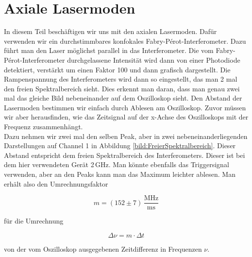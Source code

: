 \section{Axiale Lasermoden}

In diesem Teil beschäftigen wir uns mit den axialen Lasermoden. Dafür verwenden wir ein durchstimmbares konfokales Fabry-Pérot-Interferometer. 
Dazu führt man den Laser möglichst parallel in das Interferometer. Die vom Fabry-Pérot-Interferometer durchgelassene Intensität wird dann von einer 
Photodiode detektiert, verstärkt um einen Faktor 100 und dann grafisch dargestellt. Die Rampenspannung des Interferometers wird dann so eingestellt, 
das man 2 mal den freien Spektralbereich sieht. Dies erkennt man daran, dass man genau zwei mal das gleiche Bild nebeneinander auf dem Oszilloskop sieht. 
Den Abstand der Lasermoden bestimmen wir einfach durch Ablesen am Oszilloskop. Zuvor müssen wir aber herausfinden, wie das Zeitsignal auf der 
x-Achse des Oszilloskops mit der Frequenz zusammenhängt.\\

Dazu nehmen wir zwei mal den selben Peak, aber in zwei nebeneinanderliegenden Darstellungen auf Channel 1 in Abbildung \ref{bild:FreierSpektralbereich}.
Dieser Abstand entspricht dem freien Spektralbereich des Interferometers. Dieser ist bei dem hier verwendeten Gerät 2\,GHz. Man könnte ebenfalls das Triggersignal verwenden, 
aber an den Peaks kann man das Maximum leichter ablesen. Man erhält also den Umrechnungsfaktor 

\begin{equation*}
    m = (152 \pm 7)\,\frac{\mathrm{MHz}}{\mathrm{ms}}
\end{equation*}

für die Umrechnung 

\begin{equation}
    \Delta \nu = m\cdot \Delta t
    \label{eq:Umrechnung}
\end{equation}

von der vom Oszilloskop ausgegebenen Zeitdifferenz in Frequenzen $\nu$.


